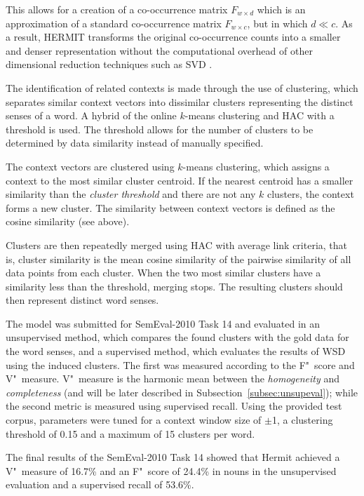 This allows for a creation of a co-occurrence matrix $F_{w \times d}$ which is
an approximation of a standard co-occurrence matrix $F_{w \times c}$, but in
which $d \ll c$. As a result, HERMIT transforms the original co-occurrence 
counts into a smaller and denser representation without the computational 
overhead of other dimensional reduction techniques such as \ac{SVD} 
\citep{jurgens2010hermit}.

The identification of related contexts is made through the use of clustering, 
which separates similar context vectors into dissimilar clusters representing 
the distinct senses of a word. A hybrid of the online $k$-means clustering 
\citep{liberty2016algorithm} and \ac{HAC} \citep{zepeda2013hierarchical} with a 
threshold is used. The threshold allows for the number of clusters to be 
determined by data similarity instead of manually specified.

The context vectors are clustered using $k$-means clustering, which assigns a 
context to the most similar cluster centroid. If the nearest centroid has a 
smaller similarity than the \textit{cluster threshold} and there are not any 
$k$ clusters, the context forms a new cluster. The similarity between context 
vectors is defined as the cosine similarity (see above).

Clusters are then repeatedly merged using \ac{HAC} with average link criteria,
that is, cluster similarity is the mean cosine similarity of the pairwise
similarity of all data points from each cluster. When the two most similar
clusters have a similarity less than the threshold, merging stops. The resulting
clusters should then represent distinct word senses.

The model was submitted for SemEval-2010 Task 14 \citep{manandhar2009semeval}
and evaluated in an unsupervised method, which compares the found clusters with 
the gold data for the word senses, and a supervised method, which evaluates the 
results of \ac{WSD} using the induced clusters. The first was measured
according to the F"~score and V"~measure. V"~measure is the harmonic mean 
between the \emph{homogeneity} and \emph{completeness} (and will be later 
described in Subsection~\ref{subsec:unsupeval}); while the second metric is 
measured using supervised recall. Using the provided test corpus, parameters 
were tuned for a context window size of $\pm$1, a clustering threshold of 0.15 
and a maximum of 15 clusters per word.

The final results of the SemEval-2010 Task 14 showed that Hermit achieved a
V"~measure of 16.7\% and an F"~score of 24.4\% in nouns in the unsupervised
evaluation and a supervised recall of 53.6\%.


